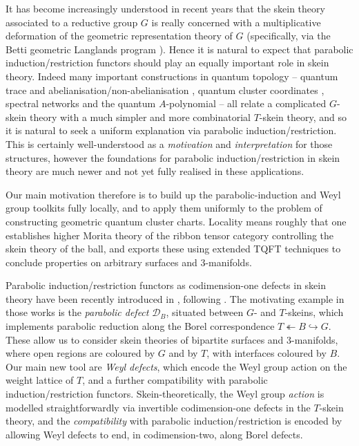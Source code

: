 \documentclass[a4paper]{article}
\numberwithin{equation}{section}
\newcommand{\1}{{\mathrm{1}\mkern-4mu{\mathchoice{}{}{\mskip-0.5mu}{\mskip-1mu}}\mathrm{l}}}
\newcommand{\D}{\mathcal{D}}
\begin{document}
It has become increasingly understood in recent years that the skein theory associated to a reductive group $G$ is really concerned with a multiplicative deformation of the geometric representation theory of $G$ (specifically, via the Betti geometric Langlands program \cite{BenZvNadler2018}). Hence it is natural to expect that parabolic induction/restriction functors should play an equally important role in skein theory.
Indeed many important constructions in quantum topology -- quantum trace and abelianisation/non-abelianisation \cite{bonahon2011quantum,Le_2017,korinman2022quantum,Panitch_Park_2024,Garoufalidis_Yu_2024}, quantum cluster coordinates \cite{Fock_Goncharov_2009a,Fock_Goncharov_2009b}, spectral networks \cite{gaiotto2013spectral} and the quantum $A$-polynomial \cite{Garoufalidis_2004,Dimofte2011,Brown_Jordan_2025} -- all relate a complicated $G$-skein theory with a much simpler and more combinatorial $T$-skein theory, and so it is natural to seek a uniform explanation via parabolic induction/restriction.  This is certainly well-understood as a \emph{motivation} and \emph{interpretation} for those structures, however the foundations for parabolic induction/restriction in skein theory are much newer and not yet fully realised in these applications.

Our main motivation therefore is to build up the parabolic-induction and Weyl group toolkits fully locally, and to apply them uniformly to the problem of constructing geometric quantum cluster charts. 
Locality means roughly that one establishes higher Morita theory of the ribbon tensor category controlling the skein theory of the ball, and exports these using extended TQFT techniques to conclude properties on arbitrary surfaces and 3-manifolds. 



Parabolic induction/restriction functors as codimension-one defects in skein theory have been recently introduced in \cite{Brown_Jordan_2025}, following \cite{JLSS2021}.
The motivating example in those works is the \emph{parabolic defect} $\D_B$, situated between $G$- and $T$-skeins, which implements parabolic reduction along the Borel correspondence $T\twoheadleftarrow B\hookrightarrow G$. These allow us to consider skein theories of bipartite surfaces and 3-manifolds, where open regions are coloured by $G$ and by $T$, with interfaces coloured by $B$. 
Our main new tool are \emph{Weyl defects}, which encode the Weyl group action on the weight lattice of $T$, and a further compatibility with parabolic induction/restriction functors.  Skein-theoretically, the Weyl group \emph{action} is modelled straightforwardly via invertible codimension-one defects in the $T$-skein theory, and the \emph{compatibility} with parabolic induction/restriction is encoded by allowing Weyl defects to end, in codimension-two, along Borel defects.
\end{document}
